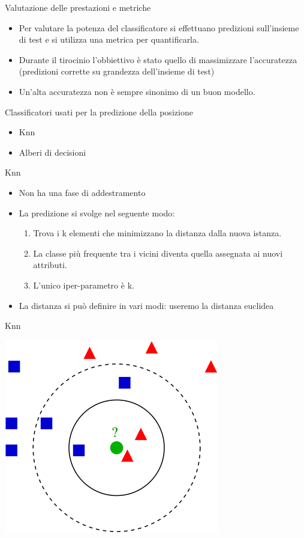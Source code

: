 \documentclass[11pt]{beamer}
\begin{document}
	\begin{frame}{Valutazione delle prestazioni e metriche}
		\begin{itemize}
			\item Per valutare la potenza del classificatore si effettuano predizioni sull'insieme di test e si utilizza una metrica per quantificarla.
			\item Durante il tirocinio l'obbiettivo \`e stato quello di massimizzare l'accuratezza (predizioni corrette su grandezza dell'insieme di test)
			\item Un'alta accuratezza non \`e sempre sinonimo di un buon modello.
		\end{itemize}
	\end{frame}
	\begin{frame}{Classificatori usati per la predizione della posizione}
		\begin{itemize}
			\item Knn
			\item Alberi di decisioni
		\end{itemize}
	\end{frame}
	\begin{frame}{Knn}
		\begin{itemize}
			\item Non ha una fase di addestramento
			\item La predizione si svolge nel seguente modo:
				\begin{enumerate}
					\item Trova i k elementi che minimizzano la distanza dalla nuova istanza.
					\item La classe pi\`u frequente tra i vicini diventa quella assegnata ai nuovi attributi.
					\item L'unico iper-parametro \`e k.
				\end{enumerate}
			\item La distanza si pu\`o definire in vari modi: useremo la distanza euclidea
		\end{itemize}
	\end{frame}
	\begin{frame}{Knn}
		\begin{center}
			\includegraphics[width=0.7\linewidth]{img/knn_example}
		\end{center}
	\end{frame}
\end{document}
